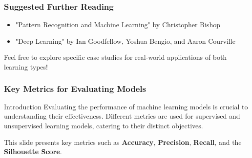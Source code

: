 \documentclass[aspectratio=169]{beamer}
\begin{document}
\begin{frame}[fragile]
    \frametitle{Suggested Further Reading}
    \begin{itemize}
        \item "Pattern Recognition and Machine Learning" by Christopher Bishop
        \item "Deep Learning" by Ian Goodfellow, Yoshua Bengio, and Aaron Courville
    \end{itemize}
    Feel free to explore specific case studies for real-world applications of both learning types!
\end{frame}

\begin{frame}[fragile]
    \frametitle{Key Metrics for Evaluating Models}
    \begin{block}{Introduction}
        Evaluating the performance of machine learning models is crucial to understanding their effectiveness. 
        Different metrics are used for supervised and unsupervised learning models, catering to their distinct objectives.
    \end{block}

    This slide presents key metrics such as \textbf{Accuracy}, \textbf{Precision}, \textbf{Recall}, and the \textbf{Silhouette Score}.
\end{frame}
\end{document}

